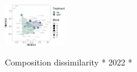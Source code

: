 \documentclass[
]{article}
\begin{document}
\includegraphics[width=100]{log-project-aubrie-winnie_files/figure-latex/unnamed-chunk-5-3}

Composition dissimilarity * 2022 *
\end{document}
